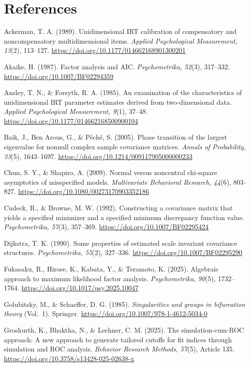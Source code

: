 \section*{References}
\begingroup\small\setlength{\parindent}{-1.5em}\setlength{\leftskip}{1.5em}
Ackerman, T. A. (1989). Unidimensional IRT calibration of compensatory and noncompensatory multidimensional items. \textit{Applied Psychological Measurement, 13}(2), 113--127. \url{https://doi.org/10.1177/014662168901300201}

Akaike, H. (1987). Factor analysis and AIC. \textit{Psychometrika, 52}(3), 317--332. \url{https://doi.org/10.1007/BF02294359}

Ansley, T. N., \& Forsyth, R. A. (1985). An examination of the characteristics of unidimensional IRT parameter estimates derived from two-dimensional data. \textit{Applied Psychological Measurement, 9}(1), 37--48. \url{https://doi.org/10.1177/014662168500900104}

Baik, J., Ben Arous, G., \& Péché, S. (2005). Phase transition of the largest eigenvalue for nonnull complex sample covariance matrices. \textit{Annals of Probability, 33}(5), 1643--1697. \url{https://doi.org/10.1214/009117905000000233}

Chun, S. Y., \& Shapiro, A. (2009). Normal versus noncentral chi-square asymptotics of misspecified models. \textit{Multivariate Behavioral Research, 44}(6), 803--827. \url{https://doi.org/10.1080/00273170903352186}

Cudeck, R., \& Browne, M. W. (1992). Constructing a covariance matrix that yields a specified minimizer and a specified minimum discrepancy function value. \textit{Psychometrika, 57}(3), 357--369. \url{https://doi.org/10.1007/BF02295424}

Dijkstra, T. K. (1990). Some properties of estimated scale invariant covariance structures. \textit{Psychometrika, 55}(2), 327--336. \url{https://doi.org/10.1007/BF02295290}

Fukasaku, R., Hirose, K., Kabata, Y., \& Teramoto, K. (2025). Algebraic approach to maximum likelihood factor analysis. \textit{Psychometrika, 90}(5), 1732--1764. \url{https://doi.org/10.1017/psy.2025.10047}

Golubitsky, M., \& Schaeffer, D. G. (1985). \textit{Singularities and groups in bifurcation theory} (Vol.~1). Springer. \url{https://doi.org/10.1007/978-1-4612-5034-0}

Groskurth, K., Bhaktha, N., \& Lechner, C. M. (2025). The simulation-cum-ROC approach: A new approach to generate tailored cutoffs for fit indices through simulation and ROC analysis. \textit{Behavior Research Methods, 57}(5), Article 135. \url{https://doi.org/10.3758/s13428-025-02638-x}

